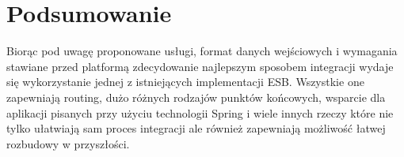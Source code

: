 \section*{Podsumowanie}
Biorąc pod uwagę proponowane usługi, format danych wejściowych i wymagania stawiane przed platformą zdecydowanie najlepszym sposobem integracji wydaje się wykorzystanie jednej z istniejących implementacji ESB. Wszystkie one zapewniają routing, dużo różnych rodzajów punktów końcowych, wsparcie dla aplikacji pisanych przy użyciu technologii Spring i wiele innych rzeczy które nie tylko ułatwiają sam proces integracji ale również zapewniają możliwość łatwej rozbudowy w przyszłości.





















